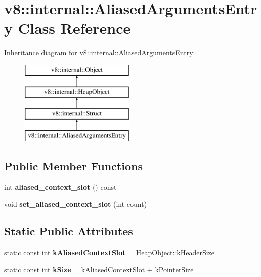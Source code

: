 \hypertarget{classv8_1_1internal_1_1_aliased_arguments_entry}{}\section{v8\+:\+:internal\+:\+:Aliased\+Arguments\+Entry Class Reference}
\label{classv8_1_1internal_1_1_aliased_arguments_entry}
Inheritance diagram for v8\+:\+:internal\+:\+:Aliased\+Arguments\+Entry\+:\begin{figure}[H]
\begin{center}
\leavevmode
\includegraphics[height=4.000000cm]{classv8_1_1internal_1_1_aliased_arguments_entry}
\end{center}
\end{figure}
\subsection*{Public Member Functions}
\begin{DoxyCompactItemize}
\item 
\hypertarget{classv8_1_1internal_1_1_aliased_arguments_entry_a5362f3a14badae7882341093623de3fb}{}int {\bfseries aliased\+\_\+context\+\_\+slot} () const \label{classv8_1_1internal_1_1_aliased_arguments_entry_a5362f3a14badae7882341093623de3fb}

\item 
\hypertarget{classv8_1_1internal_1_1_aliased_arguments_entry_ad2f671a7089a9e775abd7e1c039aeee7}{}void {\bfseries set\+\_\+aliased\+\_\+context\+\_\+slot} (int count)\label{classv8_1_1internal_1_1_aliased_arguments_entry_ad2f671a7089a9e775abd7e1c039aeee7}

\end{DoxyCompactItemize}
\subsection*{Static Public Attributes}
\begin{DoxyCompactItemize}
\item 
\hypertarget{classv8_1_1internal_1_1_aliased_arguments_entry_a176665f23529fbe29ad19856967a7ee7}{}static const int {\bfseries k\+Aliased\+Context\+Slot} = Heap\+Object\+::k\+Header\+Size\label{classv8_1_1internal_1_1_aliased_arguments_entry_a176665f23529fbe29ad19856967a7ee7}

\item 
\hypertarget{classv8_1_1internal_1_1_aliased_arguments_entry_ad9980e02f526db5b9f4e095848a2d325}{}static const int {\bfseries k\+Size} = k\+Aliased\+Context\+Slot + k\+Pointer\+Size\label{classv8_1_1internal_1_1_aliased_arguments_entry_ad9980e02f526db5b9f4e095848a2d325}

\end{DoxyCompactItemize}
